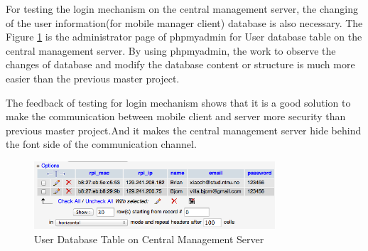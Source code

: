 \par For testing the login mechanism on the central management server, the changing of the user information(for mobile manager client) database is also necessary. The Figure \ref{fig:database_user} is the administrator page of phpmyadmin for User database table on the central management server. By using phpmyadmin, the work to observe the changes of database and modify the database content or structure is much more easier than the previous master project.
\par The feedback of testing for login mechanism shows that it is a good solution to make the communication between mobile client and server more security than previous master project.And it makes the central management server hide behind the font side of the communication channel.
\begin{figure}
	\centering
    	\includegraphics[width=0.80\textwidth,natwidth=610,natheight=642]{figs/database_user.png}
  	\caption{User Database Table on Central Management Server}
  	\label{fig:database_user}
\end{figure}

